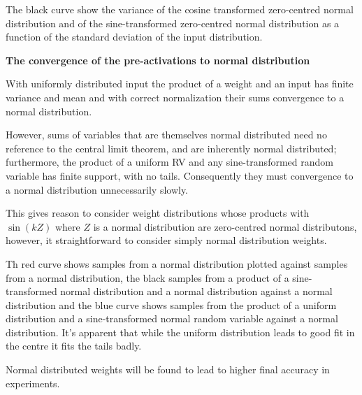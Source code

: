 \documentclass{letter}
\begin{document}
\begin{center}
\end{center}

The black curve show the variance of the cosine transformed zero-centred normal distribution and of the sine-transformed zero-centred normal distribution as a function of the standard deviation of the input distribution.

{\bf The convergence of the pre-activations to normal distribution}

With uniformly distributed input the product of a weight and an input has finite variance and mean and with correct normalization their sums convergence to a normal distribution.

However, sums of variables that are themselves normal distributed need no reference to the central limit theorem, and are inherently normal distributed; furthermore, the product of a uniform RV and any sine-transformed random variable has finite support, with no tails. Consequently they must convergence to a normal distribution unnecessarily slowly.

This gives reason to consider weight distributions whose products with $\sin(kZ)$ where $Z$ is a normal distribution are zero-centred normal distributons, however, it straightforward to consider simply normal distribution weights.

\begin{center}

\end{center}

Th red curve shows samples from a normal distribution plotted against samples from a normal distribution, the black samples from a product of a sine-transformed normal distribution and a normal distribution against a normal distribution and the blue curve shows samples from the product of a uniform distribution and a sine-transformed normal random variable against a normal distribution. It's apparent that while the uniform distribution leads to good fit in the centre it fits the tails badly.

Normal distributed weights will be found to lead to higher final accuracy in experiments.
\end{document}
